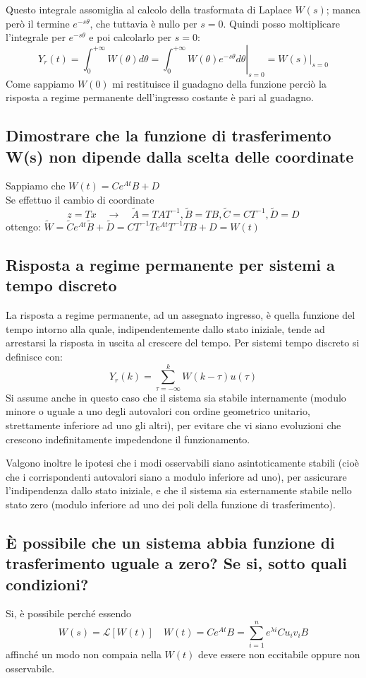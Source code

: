 \documentclass{article}
\begin{document}
Questo integrale assomiglia al calcolo della trasformata di Laplace $W(s)$;
manca però il termine $e^{-s\theta}$, che tuttavia è nullo per $s=0$.
Quindi posso moltiplicare l'integrale per  $e^{-s\theta}$ e poi calcolarlo per $s=0$:
\[ 
    Y_r(t)=\int_{0}^{+\infty}W(\theta) d\theta =\left. \int_{0}^{+\infty}W(\theta) e^{-s\theta} d\theta \right|_{s=0} =\left. W(s)\right|_{s=0}
\]
Come sappiamo $W(0)$ mi restituisce il guadagno della funzione perciò la risposta a regime permanente dell'ingresso costante è pari al guadagno.

\subsection{Dimostrare che la funzione di trasferimento W(s) non dipende dalla scelta delle coordinate}
Sappiamo che $W(t) = Ce^{At}B+D$\\
Se effettuo il cambio di coordinate 
\[ z=Tx \quad \to \quad \widetilde{A}=TAT^{-1}, \widetilde{B}=TB, \widetilde{C}=CT^{-1}, \widetilde{D}=D\]
ottengo:
$\widetilde{W}=\widetilde{C}e^{At}\widetilde{B}+\widetilde{D}=CT^{-1}Te^{At}T^{-1}TB+D=W(t)$

\subsection{Risposta a regime permanente per sistemi a tempo discreto}
La risposta a regime permanente, ad un assegnato ingresso, è quella funzione del tempo intorno alla quale, indipendentemente dallo stato iniziale,
tende ad arrestarsi la risposta in uscita al crescere del tempo.
Per sistemi tempo discreto si definisce con:
\[Y_r(k)=\sum_{\tau =- \infty}^{k} W(k-\tau)u(\tau) \]
Si assume anche in questo caso che il sistema sia stabile internamente (modulo minore o uguale a uno degli autovalori con ordine geometrico unitario,
strettamente inferiore ad uno gli altri), per evitare che vi siano evoluzioni che crescono
indefinitamente impedendone il funzionamento.

Valgono inoltre le ipotesi che i
modi osservabili siano asintoticamente stabili (cioè che i corrispondenti autovalori siano a modulo inferiore ad uno), per assicurare l'indipendenza dallo stato iniziale, e che
il sistema sia esternamente stabile nello stato zero (modulo inferiore ad uno dei
poli della funzione di trasferimento).

\subsection{È possibile che un sistema abbia funzione di trasferimento uguale a zero? Se si, sotto
quali condizioni?}
Si, è possibile perché essendo 
\[ W(s)=\mathscr{L}[W(t)] \quad W(t)=Ce^{At}B=\sum_{i=1}^{n}e^{\lambda i}Cu_iv_iB \]
affinché un modo non compaia nella $W(t)$ deve essere non eccitabile oppure non osservabile.
\end{document}
